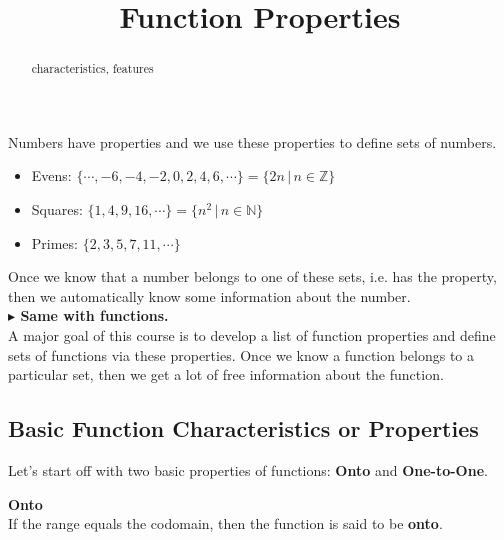 \documentclass{ximera}
\title{Function Properties}
\begin{document}
\begin{abstract}
characteristics, features
\end{abstract}
\maketitle





Numbers have properties and we use these properties to define sets of numbers. \\



\begin{itemize}
\item Evens:  $\{ \cdots, -6, -4, -2, 0, 2, 4, 6, \cdots \} = \{ 2n   \, | \, n \in \mathbb{Z} \}$
\item Squares:  $\{ 1, 4, 9, 16, \cdots \} = \{ n^2   \, | \, n \in \mathbb{N} \}$
\item Primes:  $\{ 2, 3, 5, 7, 11,  \cdots \}$
\end{itemize}

Once we know that a number belongs to one of these sets, i.e. has the property, then we automatically know some information about the number. \\


\textbf{\textcolor{red!70!black}{$\blacktriangleright$ Same with functions.}}  \\



A major goal of this course is to develop a list of function properties and define sets of functions via these properties.  Once we know a function belongs to a particular set, then we get a lot of free information about the function. \\









\subsection*{Basic Function Characteristics or Properties}


Let's start off with two basic properties of functions: \textbf{Onto} and \textbf{One-to-One}.







\begin{definition} \textbf{\textcolor{green!50!black}{Onto}} \\

If the range equals the codomain, then the function is said to be \textbf{onto}.

\end{definition}
\end{document}
